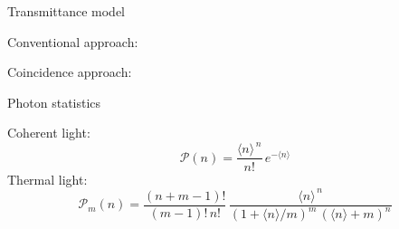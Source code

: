 \documentclass[10pt,aspectratio=43]{beamer}
\begin{document}
	\begin{frame}{Transmittance model}
		\begin{Block}{Conventional approach:}
			\vspace{0.5em}
		\end{Block}
		\begin{Block}{Coincidence approach:}
			\vspace{0.5em}
		\end{Block}
	\end{frame}
	\begin{frame}{Photon statistics}
		\begin{minipage}{.4\textwidth}
			
		\end{minipage}
		\hfill
		\begin{minipage}{.5\textwidth}
			Coherent light:
			\begin{equation}
				\mathcal{P}(n) = \frac{\langle n\rangle^{\,n}}{n!}\,e^{-\langle n\rangle}
				\nonumber
			\end{equation}
			\vspace{3em}
			Thermal light:
			\begin{equation}
				\mathcal{P}_m(n) = \frac{(n+m-1)!}{(m-1)!\,n!}\,
				\frac{\langle n\rangle^{\,n}}{\left(1+\langle n\rangle/m\right)^{m}\,\left(\langle n\rangle+m\right)^{n}} 
				\nonumber
			\end{equation}
		\end{minipage}
	\end{frame}
	
\end{document}
